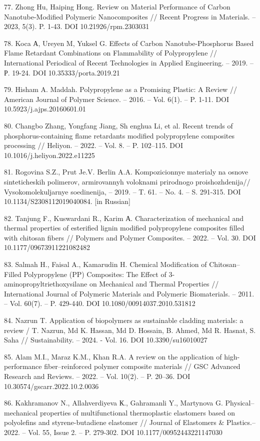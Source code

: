 \begin{references}
77. Zhong Hu, Haiping Hong. Review on Material Performance of Carbon
Nanotube-Modified Polymeric Nanocomposites // Recent Progress in
Materials. -- 2023, 5(3). P. 1-43. DOI 10.21926/rpm.2303031

78. Koca А, Ureyen M, Yuksel G. Effects of Carbon Nanotube-Phosphorus
Based Flame Retardant Combi\-nations on Flammability of Polypropylene //
International Periodical of Recent Technologies in Applied Engineering.
-- 2019. -- Р. 19-24. DOI 10.35333/porta.2019.21

79. Hisham A. Maddah. Polypropylene as a Promising Plastic: A Review //
American Journal of Polymer Science. -- 2016. -- Vol. 6(1). -- P. 1-11.
DOI 10.5923/j.ajps.20160601.01

80. Changbo Zhang, Yongfang Jiang, Sh enghua Li, et al. Recent trends of
phosphorus-containing flame retardants modified polypropylene composites
processing // Heliyon. -- 2022. -- Vol. 8. -- P. 102--115. DOI
10.1016/j.heliyon.2022.e11225

81. Rogovina S.Z., Prut Je.V. Berlin A.A. Kompozicionnye materialy na
osnove sinteticheskih polimerov, armirovannyh voloknami prirodnogo
proishozhdenija// Vysokomolekuljarnye soedinenija, -- 2019. -- T. 61. --
No. 4. -- S. 291-315. DOI 10.1134/S2308112019040084. {[}in Russian{]}

82. Tanjung F., Kuswardani R., Karim А. Characterization of mechanical
and thermal properties of esteri\-fied lignin modified polypropylene
composites filled with chitosan fibers // Polymers and Polymer
Compo\-sites. -- 2022. -- Vol. 30. DOI 10.1177/09673911221082482

83. Salmah H., Faisal A., Kamarudin H. Chemical Modification of
Chitosan--Filled Polypropylene (PP) Composites: The Effect of
3-aminopropyltriethoxysilane on Mechanical and Thermal Properties //
Inte\-rnational Journal of Polymeric Materials and Polymeric Biomaterials.
-- 2011. -- Vol. 60(7). -- P. 429-440. DOI 10.1080/00914037.2010.531812

84. Nazrun T. Application of biopolymers as sustainable cladding
materials: a review / T. Nazrun, Md K. Hassan, Md D. Hossain, B. Ahmed,
Md R. Hasnat, S. Saha // Sustainability. -- 2024. - Vol. 16. DOI
10.3390/su16010027

85. Alam M.I., Maraz K.M., Khan R.A. A review on the application of
high-performance fiber--reinforced polymer composite materials // GSC
Advanced Research and Reviews. -- 2022. -- Vol. 10(2). -- P. 20--36. DOI
10.30574/gscarr.2022.10.2.0036

86. Kakhramanov N., Allahverdiyeva К., Gahramanli Y., Martynova G.
Physical--mechanical properties of multifunctional thermoplastic
elastomers based on polyolefins and styrene-butadiene elastomer //
Journal of Elastomers \& Plastics.-- 2022. -- Vol. 55, Issue 2. -- P.
279-302. DOI 10.1177/00952443221147030


\end{references}

